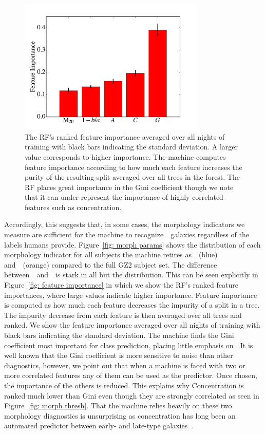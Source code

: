 \begin{figure}[t]
\includegraphics[width=3.5in]{Figures/human_machine/f11.pdf}
\caption[Random Forest's feature importances]{The RF's ranked feature importance averaged over all nights of training with black bars indicating the standard deviation. A larger value corresponds to higher importance. The machine computes feature importance according to how much each feature increases the purity of the resulting split averaged over all trees in the forest. The RF places great importance in the Gini coefficient though we note that it can under-represent the importance of highly correlated features such as concentration.\label{fig: feature importance}}
\end{figure}

Accordingly, this suggests that, in some cases, the morphology indicators we measure are 
sufficient for the machine to recognize~\feat~galaxies regardless of the labels humans provide. 
Figure~\ref{fig: morph params} shows the distribution of each 
morphology indicator for all subjects the machine retires as~\feat~(blue) 
and~\notfeat~(orange) compared to the full GZ2 subject set. 
The difference between~\feat~and~\notfeat~is stark in all but the  distribution. 
This can be seen explicitly in Figure~\ref{fig:  feature importance} in which
we show the RF's ranked feature importances, where large values indicate higher importance. 
Feature importance is computed as how much each feature decreases the impurity 
of a split in a tree. The impurity decrease from each feature is then averaged over
all trees and ranked. 
We show the feature importance averaged over all nights of training with 
black bars indicating the standard deviation. The machine finds the Gini coefficient 
most important for class prediction, placing little emphasis on . 
It is well known that the Gini coefficient is more sensitive to noise than other diagnostics, 
however, we point out that when a machine is faced with two or more correlated features 
any of them can be used as the predictor. Once chosen, the importance of the others is reduced. 
This explains why Concentration is ranked much lower than Gini even though they 
are strongly correlated as seen in Figure~\ref{fig: morph thresh}. 
That the machine relies heavily on these two morphology diagnostics is unsurprising as
concentration has long been an automated predictor between early- and late-type galaxies~\citep{Abraham1994, Abraham1996, Shen2003}.


